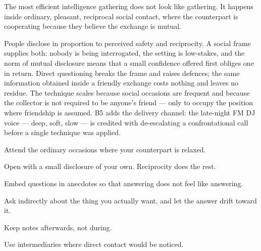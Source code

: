 


\begin{core}
The most efficient intelligence gathering does not look like gathering. It happens inside ordinary, pleasant, reciprocal social contact, where the counterpart is cooperating because they believe the exchange is mutual.
\end{core}

\begin{mechanism}
People disclose in proportion to perceived safety and reciprocity. A social frame supplies both: nobody is being interrogated, the setting is low-stakes, and the norm of mutual disclosure means that a small confidence offered first obliges one in return. Direct questioning breaks the frame and raises defences; the same information obtained inside a friendly exchange costs nothing and leaves no residue. The technique scales because social occasions are frequent and because the collector is not required to be anyone's friend --- only to occupy the position where friendship is assumed. B5 adds the delivery channel: the late-night FM DJ voice --- deep, soft, slow --- is credited with de-escalating a confrontational call before a single technique was applied.
\end{mechanism}

\begin{application}
  \item Attend the ordinary occasions where your counterpart is relaxed.
  \item Open with a small disclosure of your own. Reciprocity does the rest.
  \item Embed questions in anecdotes so that answering does not feel like answering.
  \item Ask indirectly about the thing you actually want, and let the answer drift toward it.
  \item Keep notes afterwards, not during.
  \item Use intermediaries where direct contact would be noticed.
\end{application}

